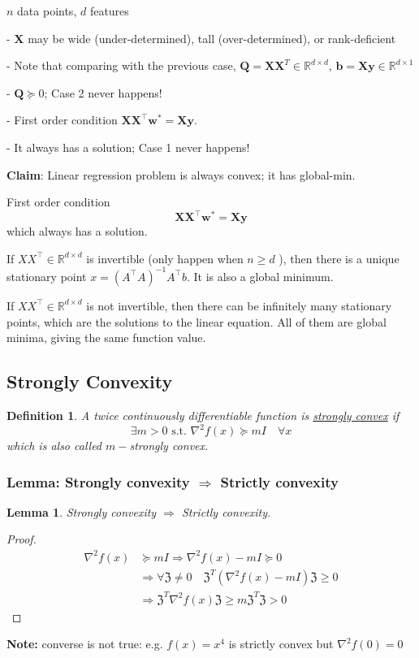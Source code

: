 \documentclass[11pt,a4paper]{article}
\newtheorem{lemma}{Lemma}
\newtheorem{definition}{Definition}
\begin{document}
$n$ data points, $d$ features

- $\mathbf{X}$ may be wide (under-determined), tall (over-determined), or rank-deficient

- Note that comparing with the previous case, $\mathbf{Q}=\mathbf{X X}^{T} \in \mathbb{R}^{d \times d}$, $\mathbf{b}=\mathbf{X} \mathbf{y} \in \mathbb{R}^{d \times 1}$

- $\mathbf{Q} \succeq 0$; Case 2 never happens!

- First order condition $\mathbf{X X}^{\top} \mathbf{w}^{*}=\mathbf{X} \mathbf{y}$.

\quad - It always has a solution; Case 1 never happens!

\textbf{Claim}: Linear regression problem is always convex; it has global-min.

First order condition
$$
\mathbf{X X}^{\top} \mathbf{w}^{*}=\mathbf{X} \mathbf{y}
$$
which always has a solution.

If $X X^{\top} \in \mathbb{R}^{d \times d}$ is invertible (only happen when $n \geq d$ ), then there is a unique stationary point $x=\left(A^{\top} A\right)^{-1} A^{\top} b$. It is also a global minimum.

If $X X^{\top} \in \mathbb{R}^{d \times d}$ is not invertible, then there can be infinitely many stationary points, which are the solutions to the linear equation.
All of them are global minima, giving the same function value.

\subsection{Strongly Convexity}
\begin{definition}
A twice continuously differentiable function is \underline{strongly convex} if $$\exists m>0\text{ s.t. }\nabla^2 f(x)\succeq mI\quad \forall x$$
which is also called $m-$strongly convex.
\end{definition}
\subsubsection{Lemma: Strongly convexity $\Rightarrow$ Strictly convexity}
\begin{lemma}
    Strongly convexity $\Rightarrow$ Strictly convexity.
\end{lemma}
\begin{proof}
\begin{equation}
    \begin{aligned}
        \nabla^2 f(x)&\succeq mI \Rightarrow \nabla^2 f(x)-mI\succeq 0\\
        & \Rightarrow \forall \mathfrak{Z}\neq 0\quad \mathfrak{Z}^T(\nabla^2 f(x)-mI)\mathfrak{Z}\geq 0\\
        & \Rightarrow \mathfrak{Z}^T\nabla^2 f(x)\mathfrak{Z}\geq m\mathfrak{Z}^T\mathfrak{Z}>0
    \end{aligned}
    \nonumber
\end{equation}
\end{proof}
\textbf{Note: }converse is not true: e.g. $f(x)=x^4$ is strictly convex but $\nabla^2 f(0)=0$
\end{document}
